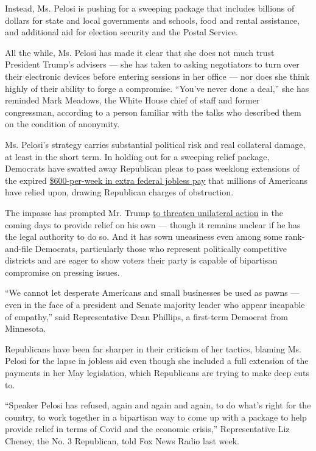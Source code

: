 Instead, Ms. Pelosi is pushing for a sweeping package that includes
billions of dollars for state and local governments and schools, food
and rental assistance, and additional aid for election security and the
Postal Service.

All the while, Ms. Pelosi has made it clear that she does not much trust
President Trump's advisers --- she has taken to asking negotiators to
turn over their electronic devices before entering sessions in her
office --- nor does she think highly of their ability to forge a
compromise. ``You've never done a deal,'' she has reminded Mark Meadows,
the White House chief of staff and former congressman, according to a
person familiar with the talks who described them on the condition of
anonymity.

Ms. Pelosi's strategy carries substantial political risk and real
collateral damage, at least in the short term. In holding out for a
sweeping relief package, Democrats have swatted away Republican pleas to
pass weeklong extensions of the expired
\href{https://www.nytimes.com/2020/08/08/business/economy/lost-unemployment-benefits.html}{\$600-per-week
in extra federal jobless pay} that millions of Americans have relied
upon, drawing Republican charges of obstruction.

The impasse has prompted Mr. Trump
\href{https://www.nytimes.com/2020/08/07/us/politics/trump-congress-stimulus.html}{to
threaten unilateral action} in the coming days to provide relief on his
own --- though it remains unclear if he has the legal authority to do
so. And it has sown uneasiness even among some rank-and-file Democrats,
particularly those who represent politically competitive districts and
are eager to show voters their party is capable of bipartisan compromise
on pressing issues.

``We cannot let desperate Americans and small businesses be used as
pawns --- even in the face of a president and Senate majority leader who
appear incapable of empathy,'' said Representative Dean Phillips, a
first-term Democrat from Minnesota.

Republicans have been far sharper in their criticism of her tactics,
blaming Ms. Pelosi for the lapse in jobless aid even though she included
a full extension of the payments in her May legislation, which
Republicans are trying to make deep cuts to.

``Speaker Pelosi has refused, again and again and again, to do what's
right for the country, to work together in a bipartisan way to come up
with a package to help provide relief in terms of Covid and the economic
crisis,'' Representative Liz Cheney, the No. 3 Republican, told Fox News
Radio last week.

